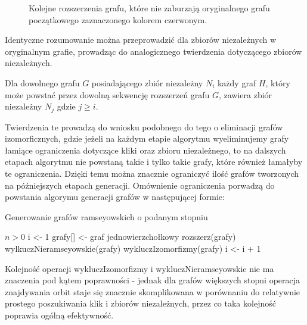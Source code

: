 \begin{figure}[H]
   		\caption{Kolejne rozszerzenia grafu, które nie zaburzają oryginalnego grafu początkowego zaznaczonego kolorem czerwonym.}
   		\label{rozszerzeniekliki}
\end{figure}
Identyczne rozumowanie można przeprowadzić dla zbiorów niezależnych w oryginalnym grafie, prowadząc do analogicznego twierdzenia dotyczącego zbiorów niezależnych.
\begin{theorem}
Dla dowolnego grafu $G$ posiadającego zbiór niezależny $N_i$ każdy graf $H$, który może powstać przez dowolną sekwencję rozszerzeń grafu $G$, zawiera zbiór niezależny $N_j$ gdzie $j \geq i$.
\end{theorem}
Twierdzenia te prowadzą do wniosku podobnego do tego o eliminacji grafów izomorficznych, gdzie jeżeli na każdym etapie algorytmu wyeliminujemy grafy łamiące ograniczenia dotyczące kliki oraz zbioru niezależnego, to na dalszych etapach algorytmu nie powstaną takie i tylko takie grafy, które również łamałyby te ograniczenia. Dzięki temu można znacznie ograniczyć ilość grafów tworzonych na późniejszych etapach generacji. 
Omównienie ograniczenia porwadzą do powstania algorymu generacji grafów w następującej formie:

\begin{algorithm}[H]
  \caption{Generowanie grafów ramseyowskich o podanym stopniu}
  \begin{algorithmic}
  \REQUIRE $n > 0 $
  \STATE i <- 1
  \STATE grafy[] <- graf jednowierzchołkowy 
    \STATE rozszerz(grafy)
    \STATE wylkuczNieramseyowskie(grafy)
    \STATE wykluczIzomorfizmy(grafy)
    \STATE i <- i + 1
  \ENDWHILE
  \end{algorithmic}
\end{algorithm}

Kolejność operacji wykluczIzomorfizmy i wykluczNieramseyowskie nie ma znaczenia pod kątem poprawności - jednak dla grafów większych stopni operacja znajdywania orbit staje się znacznie skomplikowana w porównaniu do relatywnie prostego poszukiwania klik i zbiorów niezależnych, przez co taka kolejność poprawia ogólną efektywność. 

